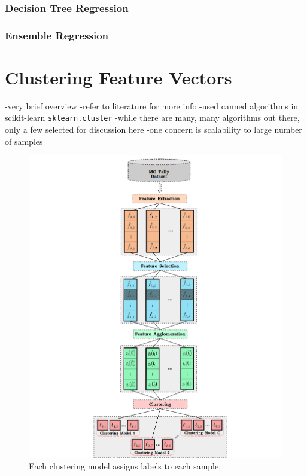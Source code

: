 \subsubsection{Decision Tree Regression}
\label{subsubsec:chap10-decision-trees}

\subsubsection{Ensemble Regression}
\label{subsubsec:chap10-ensemble-methods}


\section{Clustering Feature Vectors}
\label{sec:chap10-clustering-algorithms}

-very brief overview
-refer to literature for more info
-used canned algorithms in scikit-learn \texttt{sklearn.cluster}
-while there are many, many algorithms out there, only a few selected for discussion here
  -one concern is scalability to large number of samples

\begin{figure}[h!]
\centering
\includegraphics[width=0.95\linewidth]{figures/unsupervised/features/engineering/cluster}
\vspace{2mm}
\caption[\textit{i}MGXS clustering]{Each clustering model assigns labels to each sample.}
\label{fig:chap10-cluster}
\end{figure}

